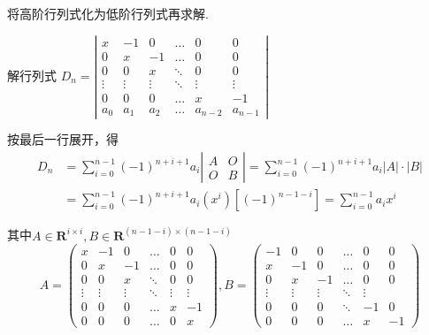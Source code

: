 将高阶行列式化为低阶行列式再求解. 

\begin{example}
    解行列式
$D_n=\left|\begin{array}{cccccc}
x & -1 & 0 & \ldots & 0 & 0 \\
0 & x & -1 & \ldots & 0 & 0 \\
0 & 0 & x & \ddots & 0 & 0 \\
\vdots & \vdots & \vdots & \ddots & \vdots & \vdots \\
0 & 0 & 0 & \ldots & x & -1 \\
a_{0} & a_{1} & a_{2} &\ldots &a_{n-2}&a_{n-1}
\end{array}\right|$
\end{example}

\begin{solution}
    按最后一行展开，得
$$
\begin{aligned}
D_{n}&=\sum_{i=0}^{n-1}(-1)^{n+i+1}a_i\left|\begin{array}{cccccc}
A&O\\
O&B
\end{array}\right|
=\sum_{i=0}^{n-1}(-1)^{n+i+1}a_i|A|\cdot|B|\\
&=\sum_{i=0}^{n-1}(-1)^{n+i+1}a_i\left(x^i\right)\left[(-1)^{n-1-i}\right]
=\sum_{i=0}^{n-1}a_ix^i
\end{aligned}
$$

其中$A\in \mathbf{R}^{i\times i}, B\in \mathbf{R}^{(n-1-i)\times (n-1-i)}$
$$
A=\begin{pmatrix}
x & -1 & 0 & \ldots & 0 &0\\
0 & x & -1 & \ldots & 0&0\\
0 & 0 & x & \ddots & 0&0\\
\vdots & \vdots & \vdots & \ddots & \vdots & \vdots\\
0 & 0 & 0 & \ldots &x & -1\\
0 & 0 & 0 & \ldots &0 & x
\end{pmatrix},
B=\begin{pmatrix}
-1 & 0 & 0 & \ldots & 0 &0\\
x & -1 & 0 & \ldots & 0 &0\\
0 & x & -1 & \ldots & 0 &0\\
\vdots & \vdots & \vdots & \ddots & \vdots\\
0 & 0 & 0 & \ddots &-1 & 0\\
0 & 0 & 0 & \ldots &x & -1
\end{pmatrix}
$$
\end{solution}

